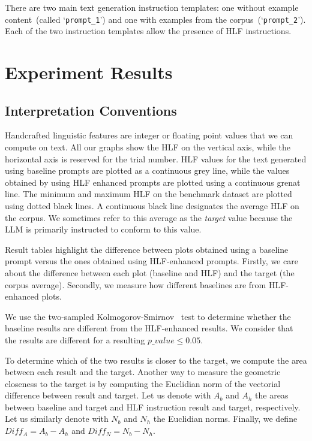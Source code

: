 \documentclass[11pt]{article}
\begin{document}
There are two main text generation instruction templates: one without example
content~(called `\texttt{prompt\_1}') and one with examples from the
corpus~(`\texttt{prompt\_2}').
Each of the two instruction templates allow the presence of HLF instructions.

\section{Experiment Results}

\subsection{Interpretation Conventions}

Handcrafted linguistic features are integer or floating point values that we
can compute on text.
All our graphs show the HLF on the vertical axis, while the horizontal axis is
reserved for the trial number.
HLF values for the text generated using baseline prompts are plotted as a
continuous grey line, while the values obtained by using HLF enhanced prompts
are plotted using a continuous grenat line.
The minimum and maximum HLF on the benchmark dataset are plotted using dotted
black lines.
A continuous black line designates the average HLF on the corpus.
We sometimes refer to this average as the \textit{target} value because the LLM
is primarily instructed to conform to this value.

Result tables highlight the difference between plots obtained using a
baseline prompt versus the ones obtained using HLF-enhanced prompts.
Firstly, we care about the difference between each plot (baseline and HLF) and
the target (the corpus average).
Secondly, we measure how different baselines are from HLF-enhanced plots.

We use the two-sampled Kolmogorov-Smirnov~\cite{kolmogorov1933,smirnov1939} test
to determine whether the baseline results are different from the HLF-enhanced
results.
We consider that the results are different for a resulting $p\_value \le 0.05$.

To determine which of the two results is closer to the target, we compute the
area between each result and the target.
Another way to measure the geometric closeness to the target is by computing the
Euclidian norm of the vectorial difference between result and target.
Let us denote with $A_b$ and $A_h$ the areas between baseline and target and HLF
instruction result and target, respectively.
Let us similarly denote with $N_b$ and $N_h$ the Euclidian norms.
Finally, we define $Diff_A = A_b - A_h$ and $Diff_N = N_b - N_h$.
\end{document}
